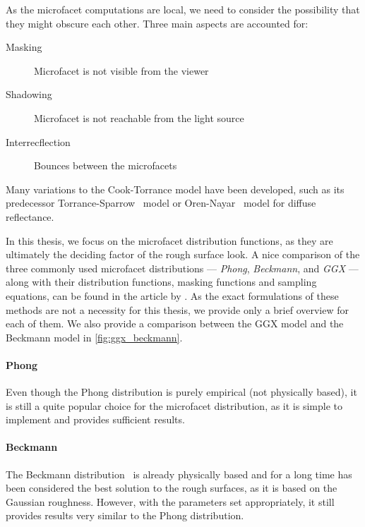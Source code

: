 As the microfacet computations are local, we need to consider the possibility that they might obscure each other. Three main aspects are accounted for:
\begin{description}
	\item[Masking] Microfacet is not visible from the viewer
	\item[Shadowing] Microfacet is not reachable from the light source
	\item[Interrecflection] Bounces between the microfacets
\end{description}

Many variations to the Cook-Torrance model have been developed, such as its predecessor Torrance-Sparrow~\cite{Torrance1967TheoryFO} model or Oren-Nayar~\cite{oren1994generalization} model for diffuse reflectance.

In this thesis, we focus on the microfacet distribution functions, as they are ultimately the deciding factor of the rough surface look. A nice comparison of the three commonly used microfacet distributions --- \emph{Phong}, \emph{Beckmann}, and \emph{GGX} --- along with their distribution functions, masking functions and sampling equations, can be found in the article by \citet{walter2007microfacet}. As the exact formulations of these methods are not a necessity for this thesis, we provide only a brief overview for each of them. We also provide a comparison between the GGX model and the Beckmann model in
\autoref{fig:ggx_beckmann}.

\paragraph{Phong}

Even though the Phong distribution is purely empirical (not physically based), it is still a quite popular choice for the microfacet distribution, as it is simple to implement and provides sufficient results.

\paragraph{Beckmann}

The Beckmann distribution~\cite{beckmann1987scattering} is already physically based and for a long time has been considered the best solution to the rough surfaces, as it is based on the Gaussian roughness. However, with the parameters set appropriately, it still provides results very similar to the Phong distribution.

